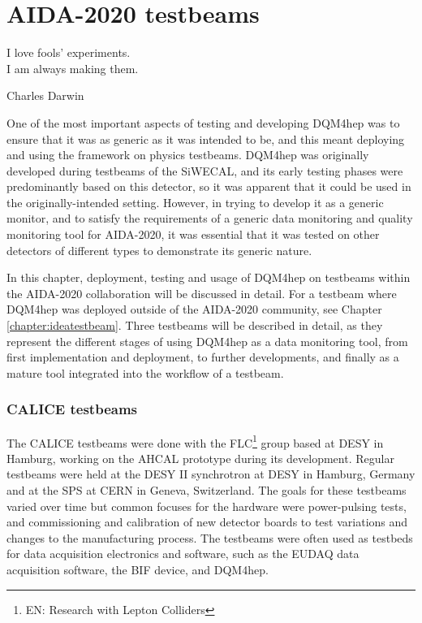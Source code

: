 \chapter{AIDA-2020 testbeams}
\label{chapter:aidatestbeams}

\epigraph{I love fools' experiments. \\I am always making them.}{Charles Darwin}

One of the most important aspects of testing and developing \acrshort{DQM4hep} was to ensure that it was as generic as it was intended to be, and this meant deploying and using the framework on physics testbeams. \acrshort{DQM4hep} was originally developed during testbeams of the \acrfull{SiWECAL}, and its early testing phases were predominantly based on this detector, so it was apparent that it could be used in the originally-intended setting. However, in trying to develop it as a generic monitor, and to satisfy the requirements of a generic data monitoring and quality monitoring tool for AIDA-2020, it was essential that it was tested on other detectors of different types to demonstrate its generic nature. 

In this chapter, deployment, testing and usage of \acrshort{DQM4hep} on testbeams within the AIDA-2020 collaboration will be discussed in detail. For a testbeam where \acrshort{DQM4hep} was deployed outside of the AIDA-2020 community, see Chapter \ref{chapter:ideatestbeam}. Three testbeams will be described in detail, as they represent the different stages of using \acrshort{DQM4hep} as a data monitoring tool, from first implementation and deployment, to further developments, and finally as a mature tool integrated into the workflow of a testbeam.

\subsection*{CALICE testbeams}
The \acrshort{CALICE} testbeams were done with the \acrfull{FLC}\footnote{EN: Research with Lepton Colliders} group based at \acrshort{DESY} in Hamburg, working on the \acrfull{AHCAL} prototype during its development. Regular testbeams were held at the DESY II synchrotron at \acrshort{DESY} in Hamburg, Germany and at the \acrfull{SPS} at \acrshort{CERN} in Geneva, Switzerland. The goals for these testbeams varied over time but common focuses for the hardware were power-pulsing tests, and commissioning and calibration of new detector boards to test variations and changes to the manufacturing process. The testbeams were often used as testbeds for data acquisition electronics and software, such as the \acrshort{EUDAQ} data acquisition software, the \acrshort{BIF} device, and \acrshort{DQM4hep}.

